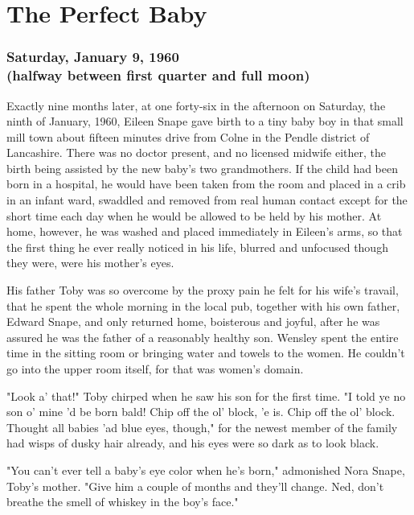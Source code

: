 
\chapter{The Perfect Baby}

\subsection{Saturday, January 9, 1960 \\ (halfway between first quarter and full moon)}

Exactly nine months later, at one forty-six in the afternoon on Saturday, the ninth of January, 1960, Eileen Snape gave birth to a tiny baby boy in that small mill town about fifteen minutes drive from Colne in the Pendle district of Lancashire. There was no doctor present, and no licensed midwife either, the birth being assisted by the new baby's two grandmothers. If the child had been born in a hospital, he would have been taken from the room and placed in a crib in an infant ward, swaddled and removed from real human contact except for the short time each day when he would be allowed to be held by his mother. At home, however, he was washed and placed immediately in Eileen's arms, so that the first thing he ever really noticed in his life, blurred and unfocused though they were, were his mother's eyes.

His father Toby was so overcome by the proxy pain he felt for his wife's travail, that he spent the whole morning in the local pub, together with his own father, Edward Snape, and only returned home, boisterous and joyful, after he was assured he was the father of a reasonably healthy son. Wensley spent the entire time in the sitting room or bringing water and towels to the women. He couldn't go into the upper room itself, for that was women's domain.

"Look a' that!" Toby chirped when he saw his son for the first time. "I told ye no son o' mine 'd be born bald! Chip off the ol' block, 'e is. Chip off the ol' block. Thought all babies 'ad blue eyes, though," for the newest member of the family had wisps of dusky hair already, and his eyes were so dark as to look black.

"You can't ever tell a baby's eye color when he's born," admonished Nora Snape, Toby's mother. "Give him a couple of months and they'll change. Ned, don't breathe the smell of whiskey in the boy's face."

